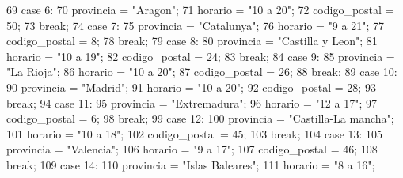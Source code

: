\begin{DoxyCode}
69                     \textcolor{keywordflow}{case} 6:
70                     provincia = \textcolor{stringliteral}{"Aragon"};
71                     horario = \textcolor{stringliteral}{"10 a 20"};
72                     codigo\_postal = 50;
73                     \textcolor{keywordflow}{break};
74                     \textcolor{keywordflow}{case} 7:
75                     provincia = \textcolor{stringliteral}{"Catalunya"};
76                     horario = \textcolor{stringliteral}{"9 a 21"};
77                     codigo\_postal = 8;
78                     \textcolor{keywordflow}{break};
79                     \textcolor{keywordflow}{case} 8:
80                     provincia = \textcolor{stringliteral}{"Castilla y Leon"};
81                     horario = \textcolor{stringliteral}{"10 a 19"};
82                     codigo\_postal = 24;
83                     \textcolor{keywordflow}{break};
84                     \textcolor{keywordflow}{case} 9:
85                     provincia = \textcolor{stringliteral}{"La Rioja"};
86                     horario = \textcolor{stringliteral}{"10 a 20"};
87                     codigo\_postal = 26;
88                     \textcolor{keywordflow}{break};
89                     \textcolor{keywordflow}{case} 10:
90                     provincia = \textcolor{stringliteral}{"Madrid"};
91                     horario = \textcolor{stringliteral}{"10 a 20"};
92                     codigo\_postal = 28;
93                     \textcolor{keywordflow}{break};
94                     \textcolor{keywordflow}{case} 11:
95                     provincia = \textcolor{stringliteral}{"Extremadura"};
96                     horario = \textcolor{stringliteral}{"12 a 17"};
97                     codigo\_postal = 6;
98                     \textcolor{keywordflow}{break};
99                     \textcolor{keywordflow}{case} 12:
100                     provincia = \textcolor{stringliteral}{"Castilla-La mancha"};
101                     horario = \textcolor{stringliteral}{"10 a 18"};
102                     codigo\_postal = 45;
103                     \textcolor{keywordflow}{break};
104                     \textcolor{keywordflow}{case} 13:
105                     provincia = \textcolor{stringliteral}{"Valencia"};
106                     horario = \textcolor{stringliteral}{"9 a 17"};
107                     codigo\_postal = 46;
108                     \textcolor{keywordflow}{break};
109                     \textcolor{keywordflow}{case} 14:
110                     provincia = \textcolor{stringliteral}{"Islas Baleares"};
111                     horario = \textcolor{stringliteral}{"8 a 16"};

\end{DoxyCode}
